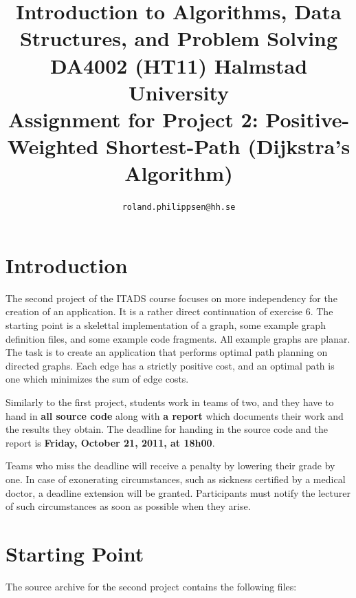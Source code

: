 \documentclass[a4paper,10pt]{article}
\begin{document}
\title{
  {\normalsize
    Introduction to Algorithms, Data Structures, and Problem Solving\\
    DA4002 (HT11) Halmstad University}\\
  Assignment for Project 2: Positive-Weighted Shortest-Path (Dijkstra's Algorithm)
}
\author{
  \texttt{roland.philippsen@hh.se}
}
\maketitle



\section{Introduction}

The second project of the ITADS course focuses on more independency for the creation of an application.
It is a rather direct continuation of exercise 6.
The starting point is a skelettal implementation of a graph, some example graph definition files, and some example code fragments.
All example graphs are planar.
The task is to create an application that performs optimal path planning on directed graphs.
Each edge has a strictly positive cost, and an optimal path is one which minimizes the sum of edge costs.

Similarly to the first project, students work in teams of two, and they have to hand in \textbf{all source code} along with \textbf{a report} which documents their work and the results they obtain.
The deadline for handing in the source code and the report is \textbf{Friday, October 21, 2011, at 18h00}.

Teams who miss the deadline will receive a penalty by lowering their grade by one.
In case of exonerating circumstances, such as sickness certified by a medical doctor, a deadline extension will be granted.
Participants must notify the lecturer of such circumstances as soon as possible when they arise.



\section{Starting Point}

The source archive for the second project contains the following files:
\end{document}
